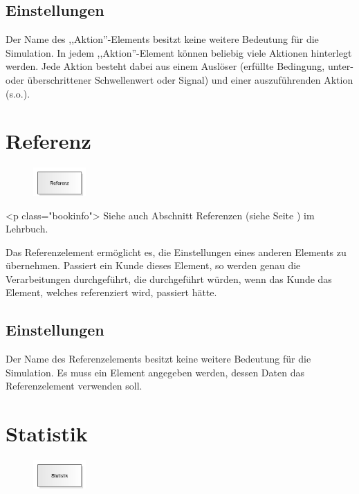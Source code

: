 \subsection*{Einstellungen}

Der Name des ,,Aktion''-Elements besitzt keine weitere Bedeutung für die Simulation.
In jedem ,,Aktion''-Element können beliebig viele Aktionen hinterlegt werden. Jede
Aktion besteht dabei aus einem Auslöser (erfüllte Bedingung, unter- oder überschrittener
Schwellenwert oder Signal) und einer auszuführenden Aktion (s.o.).


\section{Referenz}
\label{ref:ModelElementReference}

\begin{figure}
\vspace{-22pt}
\includegraphics[width=2cm]{imageModelElementReference.png}
\vspace{-22pt}
\end{figure}

<p class="bookinfo">
Siehe auch Abschnitt Referenzen (siehe Seite \pageref{ref:book:8.12.2}) im Lehrbuch.

Das Referenzelement ermöglicht es, die Einstellungen eines anderen Elements zu übernehmen.
Passiert ein Kunde dieses Element, so werden genau die Verarbeitungen durchgeführt, die
durchgeführt würden, wenn das Kunde das Element, welches referenziert wird, passiert hätte.

\subsection*{Einstellungen}

Der Name des Referenzelements besitzt keine weitere Bedeutung für die Simulation.
Es muss ein Element angegeben werden, dessen Daten das Referenzelement verwenden soll.


\section{Statistik}
\label{ref:ModelElementUserStatistic}

\begin{figure}
\vspace{-22pt}
\includegraphics[width=2cm]{imageModelElementUserStatistic.png}
\vspace{-22pt}
\end{figure}

